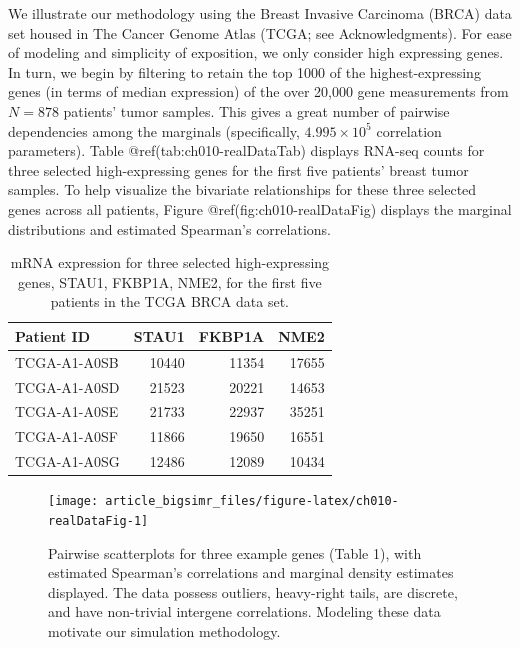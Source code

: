 \documentclass[
]{jss}
\begin{document}
We illustrate our methodology using the Breast Invasive Carcinoma (BRCA)
data set housed in The Cancer Genome Atlas (TCGA; see Acknowledgments).
For ease of modeling and simplicity of exposition, we only consider high
expressing genes. In turn, we begin by filtering to retain the top 1000
of the highest-expressing genes (in terms of median expression) of the
over 20,000 gene measurements from \(N=878\) patients' tumor samples.
This gives a great number of pairwise dependencies among the marginals
(specifically, \(\ensuremath{4.995\times 10^{5}}\) correlation
parameters). Table @ref(tab:ch010-realDataTab) displays RNA-seq counts
for three selected high-expressing genes for the first five patients'
breast tumor samples. To help visualize the bivariate relationships for
these three selected genes across all patients, Figure
@ref(fig:ch010-realDataFig) displays the marginal distributions and
estimated Spearman's correlations.

\begin{CodeChunk}
\begin{table}

\caption{\label{tab:ch010-realDataTab}mRNA expression for three selected high-expressing genes, STAU1, FKBP1A, NME2, for the first five patients in the TCGA BRCA data set.}
\centering
\begin{tabular}[t]{lrrr}
\toprule
Patient ID & STAU1 & FKBP1A & NME2\\
\midrule
TCGA-A1-A0SB & 10440 & 11354 & 17655\\
TCGA-A1-A0SD & 21523 & 20221 & 14653\\
TCGA-A1-A0SE & 21733 & 22937 & 35251\\
TCGA-A1-A0SF & 11866 & 19650 & 16551\\
TCGA-A1-A0SG & 12486 & 12089 & 10434\\
\bottomrule
\end{tabular}
\end{table}

\end{CodeChunk}

\begin{CodeChunk}
\begin{figure}

{\centering \texttt{[image: article\_bigsimr\_files/figure-latex/ch010-realDataFig-1]} 

}

\caption[Pairwise scatterplots for three example genes (Table 1), with estimated Spearman's correlations and marginal density estimates displayed]{Pairwise scatterplots for three example genes (Table 1), with estimated Spearman's correlations and marginal density estimates displayed. The data possess outliers, heavy-right tails, are discrete, and have non-trivial intergene correlations. Modeling these data motivate our simulation methodology.}\label{fig:ch010-realDataFig}
\end{figure}
\end{CodeChunk}
\end{document}
